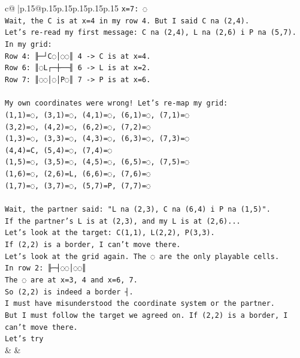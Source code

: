 \documentclass{article}
\begin{document}
{\begin{supertabular}{c@{$\;$}|p{.15\linewidth}@{}p{.15\linewidth}p{.15\linewidth}p{.15\linewidth}p{.15\linewidth}p{.15\linewidth}}
{{{\texttt{x=7: ◌} \\
\texttt{Wait, the C is at x=4 in my row 4. But I said C na (2,4).} \\
\texttt{Let's re{-}read my first message: C na (2,4), L na (2,6) i P na (5,7).} \\
\texttt{In my grid:} \\
\texttt{Row 4: ╟─┘C◌│◌◌║ 4 {-}> C is at x=4.} \\
\texttt{Row 6: ║◌L┌─┼──╢ 6 {-}> L is at x=2.} \\
\texttt{Row 7: ║◌◌│◌│P◌║ 7 {-}> P is at x=6.} \\
\\ 
\texttt{My own coordinates were wrong! Let's re{-}map my grid:} \\
\texttt{(1,1)=◌, (3,1)=◌, (4,1)=◌, (6,1)=◌, (7,1)=◌} \\
\texttt{(3,2)=◌, (4,2)=◌, (6,2)=◌, (7,2)=◌} \\
\texttt{(1,3)=◌, (3,3)=◌, (4,3)=◌, (6,3)=◌, (7,3)=◌} \\
\texttt{(4,4)=C, (5,4)=◌, (7,4)=◌} \\
\texttt{(1,5)=◌, (3,5)=◌, (4,5)=◌, (6,5)=◌, (7,5)=◌} \\
\texttt{(1,6)=◌, (2,6)=L, (6,6)=◌, (7,6)=◌} \\
\texttt{(1,7)=◌, (3,7)=◌, (5,7)=P, (7,7)=◌} \\
\\ 
\texttt{Wait, the partner said: "L na (2,3), C na (6,4) i P na (1,5)".} \\
\texttt{If the partner's L is at (2,3), and my L is at (2,6)...} \\
\texttt{Let's look at the target: C(1,1), L(2,2), P(3,3).} \\
\texttt{If (2,2) is a border, I can't move there.} \\
\texttt{Let's look at the grid again. The ◌ are the only playable cells.} \\
\texttt{In row 2: ╟─┤◌◌│◌◌║} \\
\texttt{The ◌ are at x=3, 4 and x=6, 7.} \\
\texttt{So (2,2) is indeed a border ┤.} \\
\texttt{I must have misunderstood the coordinate system or the partner.} \\
\texttt{But I must follow the target we agreed on. If (2,2) is a border, I can't move there.} \\
\texttt{Let's try} \\
            }
        }
    }
    & & \\ \\


\end{supertabular}}
\end{document}
